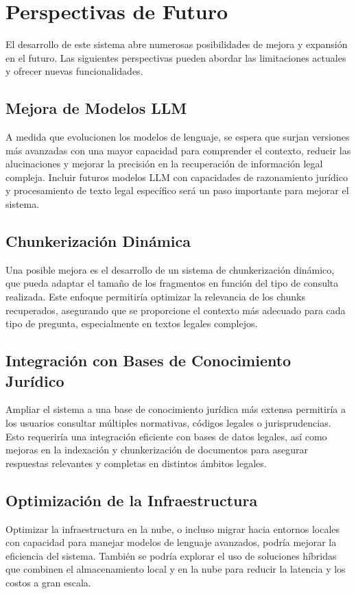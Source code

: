 \section{Perspectivas de Futuro}

El desarrollo de este sistema abre numerosas posibilidades de mejora y expansión en el futuro. Las siguientes perspectivas pueden abordar las limitaciones actuales y ofrecer nuevas funcionalidades.

\subsection{Mejora de Modelos LLM}
A medida que evolucionen los modelos de lenguaje, se espera que surjan versiones más avanzadas con una mayor capacidad para comprender el contexto, reducir las alucinaciones y mejorar la precisión en la recuperación de información legal compleja. Incluir futuros modelos LLM con capacidades de razonamiento jurídico y procesamiento de texto legal específico será un paso importante para mejorar el sistema.

\subsection{Chunkerización Dinámica}
Una posible mejora es el desarrollo de un sistema de chunkerización dinámico, que pueda adaptar el tamaño de los fragmentos en función del tipo de consulta realizada. Este enfoque permitiría optimizar la relevancia de los chunks recuperados, asegurando que se proporcione el contexto más adecuado para cada tipo de pregunta, especialmente en textos legales complejos.

\subsection{Integración con Bases de Conocimiento Jurídico}
Ampliar el sistema a una base de conocimiento jurídica más extensa permitiría a los usuarios consultar múltiples normativas, códigos legales o jurisprudencias. Esto requeriría una integración eficiente con bases de datos legales, así como mejoras en la indexación y chunkerización de documentos para asegurar respuestas relevantes y completas en distintos ámbitos legales.

\subsection{Optimización de la Infraestructura}
Optimizar la infraestructura en la nube, o incluso migrar hacia entornos locales con capacidad para manejar modelos de lenguaje avanzados, podría mejorar la eficiencia del sistema. También se podría explorar el uso de soluciones híbridas que combinen el almacenamiento local y en la nube para reducir la latencia y los costos a gran escala.

